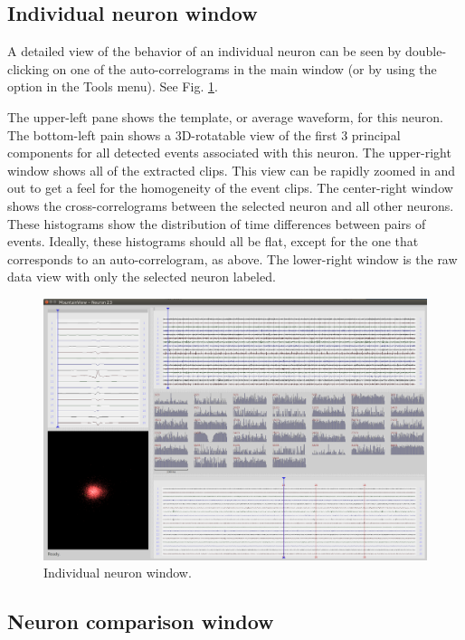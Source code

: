 \documentclass[hidelinks,10pt]{article}
\begin{document}
\subsection {Individual neuron window}

A detailed view of the behavior of an individual neuron can be seen by double-clicking on one of the auto-correlograms in the main window (or by using the option in the Tools menu). See Fig. \ref{fig:mountainview_neuron_window}.

The upper-left pane shows the template, or average waveform, for this neuron. The bottom-left pain shows a 3D-rotatable view of the first 3 principal components for all detected events associated with this neuron. The upper-right window shows all of the extracted clips. This view can be rapidly zoomed in and out to get a feel for the homogeneity of the event clips. The center-right window shows the cross-correlograms between the selected neuron and all other neurons. These histograms show the distribution of time differences between pairs of events. Ideally, these histograms should all be flat, except for the one that corresponds to an auto-correlogram, as above. The lower-right window is the raw data view with only the selected neuron labeled.

\begin{figure}[!h]
\centering
\includegraphics[width=6in]{images/mountainview_neuron_window.png}
\caption{
Individual neuron window.
}
\label{fig:mountainview_neuron_window}
\end{figure}

\subsection {Neuron comparison window}
\end{document}
